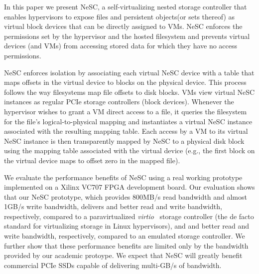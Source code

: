 In this paper we present NeSC, a self-virtualizing nested storage controller that enables hypervisors to expose files and persistent objects\footnotemark (or sets thereof) as virtual block devices that can be directly assigned to VMs. NeSC enforces the permissions set by the hypervisor and the hosted filesystem and prevents virtual devices (and VMs) from accessing stored data for which they have no access permissions.


NeSC enforces isolation by associating each virtual NeSC device with a table that maps offsets in the virtual device to blocks on the physical device. This process follows the way filesystems map file offsets to disk blocks.
%
VMs view virtual NeSC instances as regular PCIe storage controllers (block devices). Whenever the hypervisor wishes to grant a VM direct access to a file, it queries the filesystem for the file's logical-to-physical mapping and instantiates a virtual NeSC instance associated with the resulting mapping table.
%
Each access by a VM to its virtual NeSC instance is then transparently mapped by NeSC to a physical disk block using the mapping table associated with the virtual device (e.g., the first block on the virtual device maps to offset zero in the mapped file).

We evaluate the performance benefits of NeSC using a real working prototype implemented on a Xilinx VC707 FPGA development board. Our evaluation shows that our NeSC prototype, which provides 800MB/s read bandwidth and almost 1GB/s write bandwidth, delivers  and  better read and write bandwidth, respectively, compared to a paravirtualized \emph{virtio}~\cite{russell2008virtio} storage controller (the de facto standard for virtualizing storage in Linux hypervisors), and  and  better read and write bandwidth, respectively, compared to an emulated storage controller.
We further show that these performance benefits are limited only by the bandwidth provided by our academic protoype. We expect that NeSC will greatly benefit commercial PCIe SSDs capable of delivering multi-GB/s of bandwidth.






